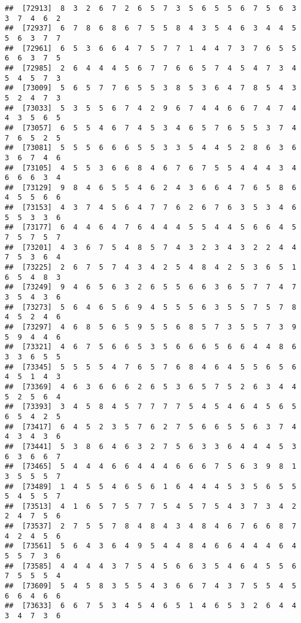\documentclass[
]{book}
\begin{document}
\begin{verbatim}
##  [72913]  8  3  2  6  7  2  6  5  7  3  5  6  5  5  6  7  5  6  3  3  7  4  6  2
##  [72937]  6  7  8  6  8  6  7  5  5  8  4  3  5  4  6  3  4  4  5  5  6  3  7  7
##  [72961]  6  5  3  6  6  4  7  5  7  7  1  4  4  7  3  7  6  5  5  6  6  3  7  5
##  [72985]  2  6  4  4  4  5  6  7  7  6  6  5  7  4  5  4  7  3  4  5  4  5  7  3
##  [73009]  5  6  5  7  7  6  5  5  3  8  5  3  6  4  7  8  5  4  3  5  2  4  7  3
##  [73033]  5  3  5  5  6  7  4  2  9  6  7  4  4  6  6  7  4  7  4  4  3  5  6  5
##  [73057]  6  5  5  4  6  7  4  5  3  4  6  5  7  6  5  5  3  7  4  7  6  5  2  5
##  [73081]  5  5  5  6  6  6  5  5  3  3  5  4  4  5  2  8  6  3  6  3  6  7  4  6
##  [73105]  4  5  5  3  6  6  8  4  6  7  6  7  5  5  4  4  4  3  4  6  6  6  3  4
##  [73129]  9  8  4  6  5  5  4  6  2  4  3  6  6  4  7  6  5  8  6  4  5  5  6  6
##  [73153]  4  3  7  4  5  6  4  7  7  6  2  6  7  6  3  5  3  4  6  5  5  3  3  6
##  [73177]  6  4  4  6  4  7  6  4  4  4  5  5  4  4  5  6  6  4  5  7  5  7  5  7
##  [73201]  4  3  6  7  5  4  8  5  7  4  3  2  3  4  3  2  2  4  4  7  5  3  6  4
##  [73225]  2  6  7  5  7  4  3  4  2  5  4  8  4  2  5  3  6  5  1  6  5  4  8  3
##  [73249]  9  4  6  5  6  3  2  6  5  5  6  6  3  6  5  7  7  4  7  3  5  4  3  6
##  [73273]  5  6  4  6  5  6  9  4  5  5  5  6  3  5  5  7  5  7  8  4  5  2  4  6
##  [73297]  4  6  8  5  6  5  9  5  5  6  8  5  7  3  5  5  7  3  9  5  9  4  4  6
##  [73321]  4  6  7  5  6  6  5  3  5  6  6  6  5  6  6  4  4  8  6  3  3  6  5  5
##  [73345]  5  5  5  5  4  7  6  5  7  6  8  4  6  4  5  5  6  5  6  4  5  1  4  3
##  [73369]  4  6  3  6  6  6  2  6  5  3  6  5  7  5  2  6  3  4  4  5  2  5  6  4
##  [73393]  3  4  5  8  4  5  7  7  7  7  5  4  5  4  6  4  5  6  5  6  5  4  2  5
##  [73417]  6  4  5  2  3  5  7  6  2  7  5  6  6  5  5  6  3  7  4  4  3  4  3  6
##  [73441]  5  3  8  6  4  6  3  2  7  5  6  3  3  6  4  4  4  5  3  6  3  6  6  7
##  [73465]  5  4  4  4  6  6  4  4  4  6  6  6  7  5  6  3  9  8  1  3  5  5  5  7
##  [73489]  1  4  5  5  4  6  5  6  1  6  4  4  4  5  3  5  6  5  5  5  4  5  5  7
##  [73513]  4  1  6  5  7  5  7  7  5  4  5  7  5  4  3  7  3  4  2  2  4  7  5  6
##  [73537]  2  7  5  5  7  8  4  8  4  3  4  8  4  6  7  6  6  8  7  4  2  4  5  6
##  [73561]  5  6  4  3  6  4  9  5  4  4  8  4  6  6  4  4  4  6  4  5  5  7  3  6
##  [73585]  4  4  4  4  3  7  5  4  5  6  6  3  5  4  6  4  5  5  6  7  5  5  5  4
##  [73609]  5  4  5  8  3  5  5  4  3  6  6  7  4  3  7  5  5  4  5  6  6  4  6  6
##  [73633]  6  6  7  5  3  4  5  4  6  5  1  4  6  5  3  2  6  4  4  3  4  7  3  6

\end{verbatim}
\end{document}
